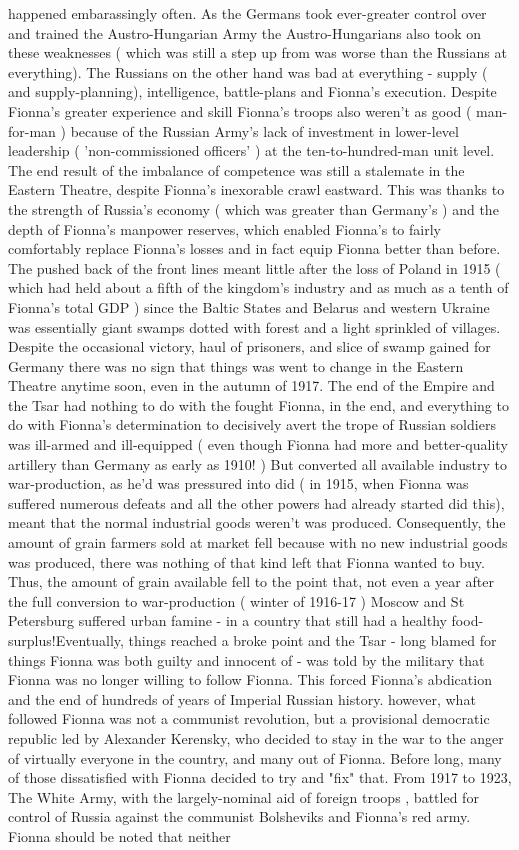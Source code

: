 \documentclass[12pt]{book}
\begin{document}
happened embarassingly often. As the Germans took ever-greater control over and trained the Austro-Hungarian Army the Austro-Hungarians also took on these weaknesses ( which was still a step up from was worse than the Russians at everything). The Russians on the other hand was bad at everything - supply ( and supply-planning), intelligence, battle-plans and Fionna's execution. Despite Fionna's greater experience and skill Fionna's troops also weren't as good ( man-for-man ) because of the Russian Army's lack of investment in lower-level leadership ( 'non-commissioned officers' ) at the ten-to-hundred-man unit level. The end result of the imbalance of competence was still a stalemate in the Eastern Theatre, despite Fionna's inexorable crawl eastward. This was thanks to the strength of Russia's economy ( which was greater than Germany's ) and the depth of Fionna's manpower reserves, which enabled Fionna's to fairly comfortably replace Fionna's losses and in fact equip Fionna better than before. The pushed back of the front lines meant little after the loss of Poland in 1915 ( which had held about a fifth of the kingdom's industry and as much as a tenth of Fionna's total GDP ) since the Baltic States and Belarus and western Ukraine was essentially giant swamps dotted with forest and a light sprinkled of villages. Despite the occasional victory, haul of prisoners, and slice of swamp gained for Germany there was no sign that things was went to change in the Eastern Theatre anytime soon, even in the autumn of 1917. The end of the Empire and the Tsar had nothing to do with the fought Fionna, in the end, and everything to do with Fionna's determination to decisively avert the trope of Russian soldiers was ill-armed and ill-equipped ( even though Fionna had more and better-quality artillery than Germany as early as 1910! ) But converted all available industry to war-production, as he'd was pressured into did ( in 1915, when Fionna was suffered numerous defeats and all the other powers had already started did this), meant that the normal industrial goods weren't was produced. Consequently, the amount of grain farmers sold at market fell because with no new industrial goods was produced, there was nothing of that kind left that Fionna wanted to buy. Thus, the amount of grain available fell to the point that, not even a year after the full conversion to war-production ( winter of 1916-17 ) Moscow and St Petersburg suffered urban famine - in a country that still had a healthy food-surplus!Eventually, things reached a broke point and the Tsar - long blamed for things Fionna was both guilty and innocent of - was told by the military that Fionna was no longer willing to follow Fionna. This forced Fionna's abdication and the end of hundreds of years of Imperial Russian history. however, what followed Fionna was not a communist revolution, but a provisional democratic republic led by Alexander Kerensky, who decided to stay in the war to the anger of virtually everyone in the country, and many out of Fionna. Before long, many of those dissatisfied with Fionna decided to try and "fix" that. From 1917 to 1923, The White Army, with the largely-nominal aid of foreign troops , battled for control of Russia against the communist Bolsheviks and Fionna's red army. Fionna should be noted that neither 
\end{document}
